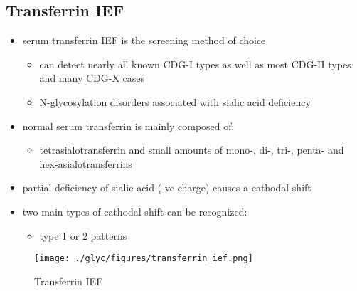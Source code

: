 \documentclass{scrartcl}
\begin{document}
\subsection{Transferrin IEF}
\label{sec:org20c765c}
\begin{itemize}
\item serum transferrin IEF is the screening method of choice
\begin{itemize}
\item can detect nearly all known CDG-I types as well as most CDG-II types and many CDG-X cases
\item N-glycosylation disorders associated with sialic acid deficiency
\end{itemize}
\item normal serum transferrin is mainly composed of:
\begin{itemize}
\item tetrasialotransferrin and small amounts of mono-, di-, tri-,
penta- and hex-asialotransferrins
\end{itemize}
\item partial deficiency of sialic acid (-ve charge) causes a
cathodal shift
\item two main types of cathodal shift can be recognized:
\begin{itemize}
\item type 1 or 2 patterns
\end{itemize}
\end{itemize}

\begin{figure}[htbp]
\centering
\texttt{[image: ./glyc/figures/transferrin\_ief.png]}
\caption{\label{fig:orgdf0fc0a}
Transferrin IEF}
\end{figure}
\end{document}
